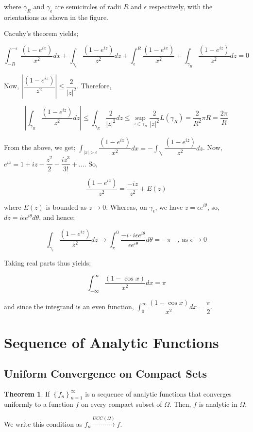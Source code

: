 \documentclass[12pt]{article}
\let\oldsection\section
\renewcommand\section{\clearpage\oldsection}
\theoremstyle{definition}
\newtheorem{thm}{Theorem}
\newenvironment{theorem}{
\begin{tcolorbox}[colback=green!5!white,colframe=green!75!black, parbox = false]\begin{thm} }{\end{thm}\end{tcolorbox} }
\begin{document}
where $\gamma_R$ and $\gamma_\epsilon$ are semicircles of radii $R$ and $\epsilon$ respectively, with the orientations as shown in the figure.

Cacuhy's theorem yields;

$$
\int_{-R}^{-\epsilon} \dfrac{(1 - e^{ix})}{x^2}dx + \int_{\gamma_\epsilon} \dfrac{(1 - e^{iz})}{z^2} dz + \int_{\epsilon}^{R} \dfrac{(1 - e^{ix})}{x^2} + \int_{\gamma_R} \dfrac{(1 - e^{iz})}{z^2} dz = 0$$

Now, $\left\vert \dfrac{(1 - e^{iz})}{z^2} \right\vert \leq \dfrac{2}{\vert z \vert^2}$. Therefore,

$$
\left\vert \int_{\gamma_R} \dfrac{(1 - e^{iz})}{z^2}dz \right\vert
\leq \int_{\gamma_R} \dfrac{2}{\vert z \vert^2} dz \leq \sup_{z \in \gamma_R} \dfrac{2}{\vert z \vert^2} L(\gamma_R) = \dfrac{2}{R^2} \pi R = \dfrac{2\pi}{R}
$$

From the above, we get; $\int_{\vert x \vert > \epsilon}\dfrac{(1 - e^{ix})}{x^2}dx = - \int_{\gamma_\epsilon} \dfrac{(1 - e^{iz})}{z^2} dz$. Now, $e^{iz} = 1 + iz - \dfrac{z^2}{2} - \dfrac{iz^3}{3!} + \dots$. So,

$$
\dfrac{(1 - e^{iz})}{z^2} = \dfrac{-iz}{z^2} + E(z)
$$

where $E(z)$ is bounded as $z \rightarrow 0$. Whereas, on $\gamma_\epsilon$, we have $z = \epsilon e^{i\theta}$, so, $dz = i\epsilon e^{i\theta} d\theta$, and hence;

$$
\int_{\gamma_\epsilon} \dfrac{(1 - e^{iz})}{z^2} dz \rightarrow \int_{\pi}^{0} \dfrac{-i\cdot i\epsilon e^{i\theta}}{\epsilon e^{i\theta}} d\theta = -\pi \quad \text{, as } \epsilon \rightarrow 0
$$

Taking real parts thus yields;

$$\int_{-\infty}^{\infty} \dfrac{(1 - \cos x)}{x^2}dx = \pi$$

and since the integrand is an even function, $\int_{0}^{\infty} \dfrac{(1 - \cos x)}{x^2}dx = \dfrac{\pi}{2}$.


\section{Sequence of Analytic Functions}
\subsection{Uniform Convergence on Compact Sets}

\begin{theorem}
    If $\left\{ f_n\right\}_{n = 1}^{\infty}$ is a sequence of analytic functions that converges uniformly to a function $f$ on every compact subset of $\Omega$. Then, $f$ is analytic in $\Omega$.

    We write this condition as $f_n \xrightarrow{UCC(\Omega)} f$.
\end{theorem}
\end{document}

